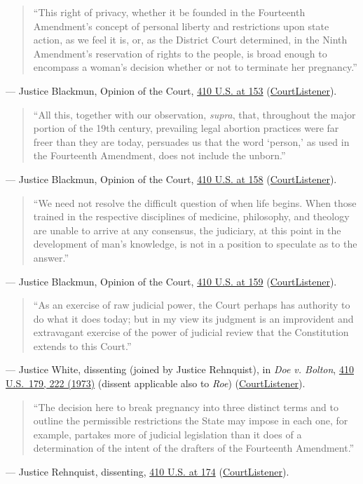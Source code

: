 \documentclass[12pt]{article}
\begin{document}
\begin{quote}
``This right of privacy, whether it be founded in the Fourteenth Amendment's concept of personal liberty and restrictions upon state action, as we feel it is, or, as the District Court determined, in the Ninth Amendment's reservation of rights to the people, is broad enough to encompass a woman's decision whether or not to terminate her pregnancy.''
\end{quote}
\noindent --- Justice Blackmun, Opinion of the Court, \href{https://supreme.justia.com/cases/federal/us/410/113/}{410 U.S. at 153} (\href{https://www.courtlistener.com/opinion/108713/roe-v-wade/}{CourtListener}).

\begin{quote}
``All this, together with our observation, \textit{supra}, that, throughout the major portion of the 19th century, prevailing legal abortion practices were far freer than they are today, persuades us that the word `person,' as used in the Fourteenth Amendment, does not include the unborn.''
\end{quote}
\noindent --- Justice Blackmun, Opinion of the Court, \href{https://supreme.justia.com/cases/federal/us/410/113/}{410 U.S. at 158} (\href{https://www.courtlistener.com/opinion/108713/roe-v-wade/}{CourtListener}).

\begin{quote}
``We need not resolve the difficult question of when life begins. When those trained in the respective disciplines of medicine, philosophy, and theology are unable to arrive at any consensus, the judiciary, at this point in the development of man's knowledge, is not in a position to speculate as to the answer.''
\end{quote}
\noindent --- Justice Blackmun, Opinion of the Court, \href{https://supreme.justia.com/cases/federal/us/410/113/}{410 U.S. at 159} (\href{https://www.courtlistener.com/opinion/108713/roe-v-wade/}{CourtListener}).

\begin{quote}
``As an exercise of raw judicial power, the Court perhaps has authority to do what it does today; but in my view its judgment is an improvident and extravagant exercise of the power of judicial review that the Constitution extends to this Court.''
\end{quote}
\noindent --- Justice White, dissenting (joined by Justice Rehnquist), in \textit{Doe v. Bolton}, \href{https://supreme.justia.com/cases/federal/us/410/179/}{410 U.S.\ 179, 222 (1973)} (dissent applicable also to \textit{Roe}) (\href{https://www.courtlistener.com/opinion/108714/doe-v-bolton/}{CourtListener}).

\begin{quote}
``The decision here to break pregnancy into three distinct terms and to outline the permissible restrictions the State may impose in each one, for example, partakes more of judicial legislation than it does of a determination of the intent of the drafters of the Fourteenth Amendment.''
\end{quote}
\noindent --- Justice Rehnquist, dissenting, \href{https://supreme.justia.com/cases/federal/us/410/113/}{410 U.S. at 174} (\href{https://www.courtlistener.com/opinion/108713/roe-v-wade/}{CourtListener}).
\end{document}
